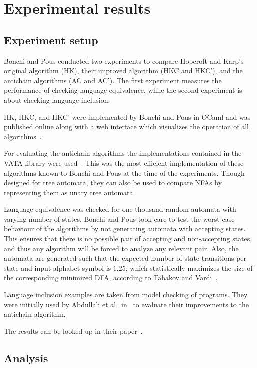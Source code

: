 \section{Experimental results}

\subsection{Experiment setup}

Bonchi and Pous conducted two experiments to compare Hopcroft and Karp's original
algorithm (HK), their improved algorithm (HKC and HKC'),
and the antichain algorithms (AC and AC').
The first experiment measures the performance of checking language equivalence,
while the second experiment is about checking language inclusion.

HK, HKC, and HKC' were implemented by Bonchi and Pous in OCaml and was published
online along with a web interface which visualizes the operation of all
algorithms~\cite{hkntonline}.

For evaluating the antichain algorithms the implementations contained in the
VATA library were used~\cite{lengal2012vata}.
This was the most efficient implementation of these algorithms known to
Bonchi and Pous at the time of the experiments.
Though designed for tree automata, they can also be used to compare NFAs
by representing them as unary tree automata.

Language equivalence was checked for one thousand random automata with varying
number of states.
Bonchi and Pous took care to test the worst-case behaviour of the algorithms by
not generating automata with accepting states.
This ensures that there is no possible pair of accepting and non-accepting
states, and thus any algorithm will be forced to analyze any relevant pair.
Also, the automata are generated such that the expected number of
state transitions per state and input alphabet symbol is $1.25$, which
statistically maximizes the size of the corresponding minimized DFA, according
to Tabakov and Vardi~\cite{Tabakov2005}.

Language inclusion examples are taken from model checking of programs.
They were initially used by Abdullah et al.\ in~\cite{abdulla2010simulation}
to evaluate their improvements to the antichain algorithm.

The results can be looked up in their paper~\cite{Bonchi:2013:CNE:2429069.2429124}.

\subsection{Analysis}


